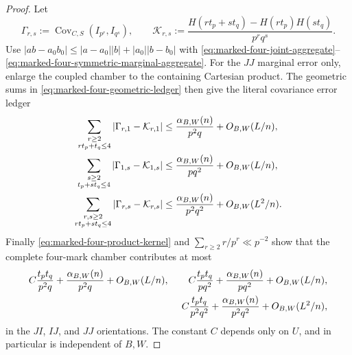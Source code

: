 \documentclass[11pt]{article}
\numberwithin{equation}{section}
\theoremstyle{definition}
\theoremstyle{remark}
\newcommand{\1}{\mathbf 1}
\begin{document}
\begin{proof}
Let
\[
 \Gamma_{r,s}:=\operatorname{Cov}_{C,S}(I_{p^r},I_{q^s}),\qquad
 \mathcal K_{r,s}:=
 \frac{H(rt_p+st_q)-H(rt_p)H(st_q)}{p^rq^s}.
\]
Use
\(
 |ab-a_0b_0|\le |a-a_0||b|+|a_0||b-b_0|
\)
with \eqref{eq:marked-four-joint-aggregate}--
\eqref{eq:marked-four-symmetric-marginal-aggregate}.  For the \(JJ\)
marginal error only, enlarge the coupled chamber to the containing
Cartesian product.  The geometric sums in
\eqref{eq:marked-four-geometric-ledger} then give the literal covariance
error ledger
\begin{align}
 \sum_{\substack{r\ge2\\rt_p+t_q\le4}}
       |\Gamma_{r,1}-\mathcal K_{r,1}|
 &\le\frac{\alpha_{B,W}(n)}{p^2q}+O_{B,W}(L/n),\notag\\
 \sum_{\substack{s\ge2\\t_p+st_q\le4}}
       |\Gamma_{1,s}-\mathcal K_{1,s}|
 &\le\frac{\alpha_{B,W}(n)}{pq^2}+O_{B,W}(L/n),\notag\\
 \sum_{\substack{r,s\ge2\\rt_p+st_q\le4}}
       |\Gamma_{r,s}-\mathcal K_{r,s}|
 &\le\frac{\alpha_{B,W}(n)}{p^2q^2}+O_{B,W}(L^2/n).
 \label{eq:marked-four-covariance-error-ledger}
\end{align}
Finally \eqref{eq:marked-four-product-kernel} and
\(\sum_{r\ge2}r/p^r\ll p^{-2}\) show that the complete four-mark chamber
contributes at most
\begin{align}
 C\frac{t_pt_q}{p^2q}
   +\frac{\alpha_{B,W}(n)}{p^2q}+O_{B,W}(L/n),\qquad
 C\frac{t_pt_q}{pq^2}
   +\frac{\alpha_{B,W}(n)}{pq^2}+O_{B,W}(L/n),\notag\\
 C\frac{t_pt_q}{p^2q^2}
   +\frac{\alpha_{B,W}(n)}{p^2q^2}+O_{B,W}(L^2/n),
 \label{eq:marked-four-covariance-aggregate}
\end{align}
in the \(JI\), \(IJ\), and \(JJ\) orientations.  The constant \(C\)
depends only on \(U\), and in particular is independent of \(B,W\).


\end{proof}
\end{document}
